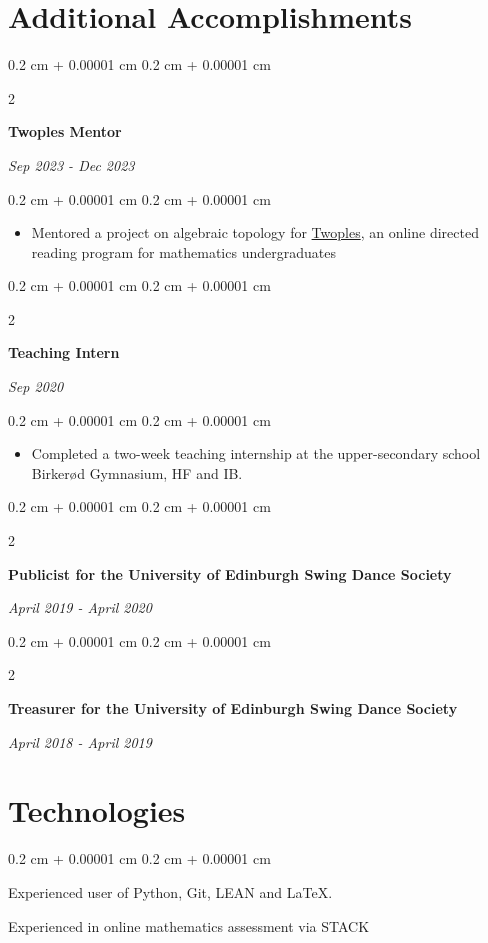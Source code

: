 \documentclass[10pt, letterpaper]{article}
\newenvironment{highlights}{
    \begin{itemize}[
        topsep=0.10 cm,
        parsep=0.10 cm,
        partopsep=0pt,
        itemsep=0pt,
        leftmargin=0.4 cm + 10pt
    ]
}{
    \end{itemize}
} %
\newenvironment{onecolentry}{
    \begin{adjustwidth}{
        0.2 cm + 0.00001 cm
    }{
        0.2 cm + 0.00001 cm
    }
}{
    \end{adjustwidth}
} %
\newenvironment{twocolentry}[2][]{
    \onecolentry
    \def\secondColumn{#2}
    \setcolumnwidth{\fill, 4.5 cm}
    \begin{paracol}{2}
}{
    \switchcolumn \raggedleft \secondColumn
    \end{paracol}
    \endonecolentry
} %
\let\hrefWithoutArrow\href
\renewcommand{\href}[2]{\hrefWithoutArrow{#1}{\ifthenelse{\equal{#2}{}}{ }{#2 }\raisebox{.15ex}{\footnotesize \faExternalLink*}}}
\begin{document}
    \section{Additional Accomplishments}



        
        \begin{twocolentry}{
        \textit{Sep 2023 - Dec 2023}}
            \textbf{Twoples Mentor}
        \end{twocolentry}

        \vspace{0.10 cm}
        \begin{onecolentry}
            \begin{highlights}
                \item Mentored a project on algebraic topology for \hrefWithoutArrow{https://sites.google.com/view/twoples/home}{Twoples}, an online directed reading program for mathematics undergraduates
            \end{highlights}
        \end{onecolentry}


        \vspace{0.2 cm}

                \begin{twocolentry}{
        \textit{Sep 2020}}
            \textbf{Teaching Intern}
        \end{twocolentry}

        \vspace{0.10 cm}
        \begin{onecolentry}
            \begin{highlights}
                \item Completed a two-week teaching internship at the upper-secondary school Birkerød Gymnasium, HF and IB.
            \end{highlights}
        \end{onecolentry}

        \vspace{0.2 cm}

                \begin{twocolentry}{
        \textit{April 2019 - April 2020}}
            \textbf{Publicist for the University of Edinburgh Swing Dance Society}
        \end{twocolentry}

        \vspace{0.2 cm}


                \begin{twocolentry}{
        \textit{April 2018 - April 2019}}
            \textbf{Treasurer for the University of Edinburgh Swing Dance Society}
        \end{twocolentry}


    
    \section{Technologies}

        \begin{onecolentry}
            Experienced user of Python, Git, LEAN and LaTeX.
            
            \vspace{0.2 cm}

            Experienced in online mathematics assessment via STACK
        \end{onecolentry}

    
\end{document}
